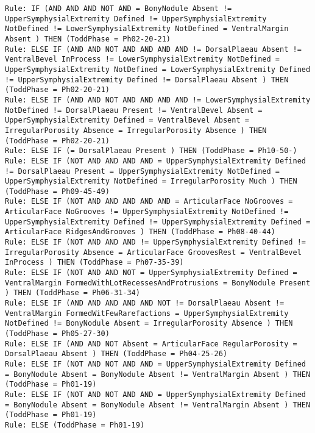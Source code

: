 \begin{lstlisting}
Rule: IF (AND AND AND NOT AND = BonyNodule Absent != UpperSymphysialExtremity Defined != UpperSymphysialExtremity NotDefined != LowerSymphysialExtremity NotDefined = VentralMargin Absent ) THEN (ToddPhase = Ph02-20-21)
Rule: ELSE IF (AND AND NOT AND AND AND AND != DorsalPlaeau Absent != VentralBevel InProcess != LowerSymphysialExtremity NotDefined = UpperSymphysialExtremity NotDefined = LowerSymphysialExtremity Defined != UpperSymphysialExtremity Defined != DorsalPlaeau Absent ) THEN (ToddPhase = Ph02-20-21)
Rule: ELSE IF (AND AND NOT AND AND AND AND != LowerSymphysialExtremity NotDefined != DorsalPlaeau Present != VentralBevel Absent = UpperSymphysialExtremity Defined = VentralBevel Absent = IrregularPorosity Absence = IrregularPorosity Absence ) THEN (ToddPhase = Ph02-20-21)
Rule: ELSE IF (= DorsalPlaeau Present ) THEN (ToddPhase = Ph10-50-)
Rule: ELSE IF (NOT AND AND AND AND = UpperSymphysialExtremity Defined != DorsalPlaeau Present = UpperSymphysialExtremity NotDefined = UpperSymphysialExtremity NotDefined = IrregularPorosity Much ) THEN (ToddPhase = Ph09-45-49)
Rule: ELSE IF (NOT AND AND AND AND AND = ArticularFace NoGrooves = ArticularFace NoGrooves != UpperSymphysialExtremity NotDefined != UpperSymphysialExtremity Defined != UpperSymphysialExtremity Defined = ArticularFace RidgesAndGrooves ) THEN (ToddPhase = Ph08-40-44)
Rule: ELSE IF (NOT AND AND AND != UpperSymphysialExtremity Defined != IrregularPorosity Absence = ArticularFace GroovesRest = VentralBevel InProcess ) THEN (ToddPhase = Ph07-35-39)
Rule: ELSE IF (NOT AND AND NOT = UpperSymphysialExtremity Defined = VentralMargin FormedWithLotRecessesAndProtrusions = BonyNodule Present ) THEN (ToddPhase = Ph06-31-34)
Rule: ELSE IF (AND AND AND AND AND NOT != DorsalPlaeau Absent != VentralMargin FormedWitFewRarefactions = UpperSymphysialExtremity NotDefined != BonyNodule Absent = IrregularPorosity Absence ) THEN (ToddPhase = Ph05-27-30)
Rule: ELSE IF (AND AND NOT Absent = ArticularFace RegularPorosity = DorsalPlaeau Absent ) THEN (ToddPhase = Ph04-25-26)
Rule: ELSE IF (NOT AND NOT AND AND = UpperSymphysialExtremity Defined = BonyNodule Absent = BonyNodule Absent != VentralMargin Absent ) THEN (ToddPhase = Ph01-19)
Rule: ELSE IF (NOT AND NOT AND AND = UpperSymphysialExtremity Defined = BonyNodule Absent = BonyNodule Absent != VentralMargin Absent ) THEN (ToddPhase = Ph01-19)
Rule: ELSE (ToddPhase = Ph01-19)
\end{lstlisting}




